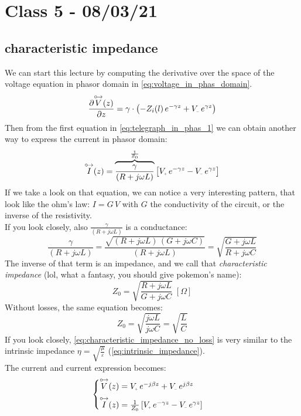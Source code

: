 \section{Class 5 - 08/03/21}
\subsection*{characteristic impedance}
We can start this lecture by computing the derivative over the space of the voltage equation in phasor domain in \cref{eq:voltage_in_phas_domain}.
\begin{equation}
    \frac{\partial \phas{V}(z)}{\partial z}=\gamma \cdot \left(-Z_i(l)\,e^{-\gamma z}+V\bottomMinus \,e^{\gamma z}\right) 
\end{equation}
Then from the first equation in \cref{eq:telegraph_in_phas_1} we can obtain another way to express the current in phasor domain:
\begin{equation}
    \phas{I}(z)=\overbrace{\frac{\gamma}{(R+j\omega L)}}^{\frac{1}{Z_0}}\left[V\bottomPlus \,e^{-\gamma z}-V\bottomMinus \,e^{\gamma z}\right]
\end{equation}
If we take a look on that equation, we can notice a very interesting pattern, that look like the ohm's law: $I=G\,V$ with $G$ the conductivity of the circuit, or the inverse of the resistivity.\\
If you look closely, also $\frac{\gamma}{(R+j\omega L)}$ is a conductance:
\begin{equation}
    \frac{\gamma}{(R+j\omega L)}=\frac{\sqrt{(R+j\omega L)\,(G+j\omega C)}}{(R+j\omega L)}=\sqrt{\frac{G+j\omega L}{R+j\omega C}}
\end{equation}
The inverse of that term is an impedance, and we call that \emph{characteristic impedance} (lol, what a fantasy, you should give pokemon's name):
\begin{equation}
    Z_0=\sqrt{\frac{R+j\omega L}{G+j\omega C}}\;\left[\Omega \right]
\end{equation}
Without losses, the same equation becomes:
\begin{equation} \label{eq:characteristic_impedance_no_loss}
    Z_0=\sqrt{\frac{j\omega L}{j\omega C}}=\sqrt{\frac{L}{C}}
\end{equation}
If you look closely, \cref{eq:characteristic_impedance_no_loss} is very similar to the intrinsic impedance $\eta = \sqrt{\frac{\mu}{\varepsilon}}$ (\cref{eq:intrinsic_impedance}).\\
The current and current expression becomes:
\begin{equation}
    \begin{cases}
    \phas{V}(z) = V\bottomPlus \,e^{-j\beta z}+V\bottomMinus \,e^{j\beta z} \\[5pt]
    \phas{I}(z)=\frac{1}{Z_0}\left[V\bottomPlus \,e^{-\gamma z}-V\bottomMinus \,e^{\gamma z}\right]
    \end{cases}\label{eq:current_and_voltage_in_TL_phas}
\end{equation}
